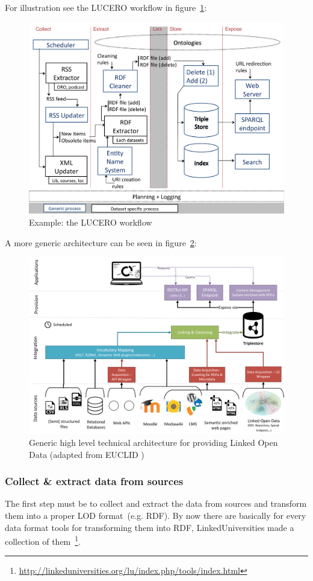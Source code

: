 \documentclass{article}
\begin{document}
For illustration see the LUCERO workflow in figure~\ref{Fi:lucero_architecture}: 
\begin{figure}[H]
\centering \includegraphics*[width=.8\columnwidth]{lucero-workflow.png}
\caption[Example: the LUCERO workflow]{Example: the LUCERO workflow~\cite{url:lucero-tabloid}}
\label{Fi:lucero_architecture}
\end{figure}

A more generic architecture can be seen in figure~\ref{Fi:tec_architecture}:

\begin{figure}[H]
\centering \includegraphics*[width=.8\columnwidth]{lod_technical_architecture.png}
\caption[Generic high level technical architecture of a LOD system]{Generic high level technical architecture for providing Linked Open Data (adapted from EUCLID {\cite{simperl_using_2013}})}
\label{Fi:tec_architecture}
\end{figure}

\subsubsection{Collect \& extract data from sources}
\label{subsubsec:sources}
The first step must be to collect and extract the data from sources and transform them into a proper LOD format~(e.g. RDF). By now there are basically for every data format tools for transforming them into RDF, LinkedUniversities made a collection of them~\footnote{\url{http://linkeduniversities.org/lu/index.php/tools/index.html}}.
\end{document}
